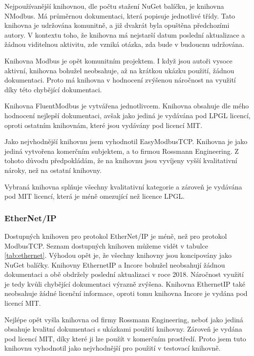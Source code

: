 Nejpoužívanější knihovnou, dle počtu stažení NuGet balíčku, je knihovna NModbus. Má průměrnou dokumentaci, která popisuje jednotlivé třídy. Tato knihovna je udržována komunitně, a již dvakrát byla opuštěna předchozími autory. V kontextu toho, že knihovna má nejstarší datum poslední aktualizace a žádnou viditelnou aktivitu, zde vzniká otázka, zda bude v budoucnu udržována.

Knihovna Modbus je opět komunitním projektem. I když jsou autoři vysoce aktivní, knihovna bohužel neobsahuje, až na krátkou ukázku použití, žádnou dokumentaci. Proto má knihovna v hodnocení zvýšenou náročnost na využití díky této chybějící dokumentaci.  

Knihovna FluentModbus je vytvářena jednotlivcem. Knihovna obsahuje dle mého hodnocení nejlepší dokumentaci, avšak jako jediná je vydávána pod LPGL licencí, oproti ostatním knihovnám, které jsou vydávány pod licencí MIT.

Jako nejvhodnější knihovnu jsem vyhodnotil EasyModbusTCP. Knihovna je jako jediná vytvořena komerčním subjektem, a to firmou Rossmann Engineering. Z tohoto důvodu předpokládám, že na knihovnu jsou vyvíjeny vyšší kvalitativní nároky, než na ostatní knihovny. 

Vybraná knihovna splňuje všechny kvalitativní kategorie a zároveň je vydávána pod MIT licencí, která je méně omezující než licence LPGL.

\subsubsection{EtherNet/IP}

Dostupných knihoven pro protokol EtherNet/IP je méně, než pro protokol ModbusTCP. Seznam dostupných knihoven můžeme vidět v tabulce \ref{tab:ethernet}. Výhodou opět je, že všechny knihovny jsou koncipovány jako NuGet balíčky. Knihovny EthernetIP a Incore bohužel neobsahují žádnou dokumentaci a obě obdržely poslední aktualizaci v roce 2018. Náročnost využití je tedy kvůli chybějící dokumentaci výrazně zvýšena. Knihovna EthernetIP také neobsahuje žádné licenční informace, oproti tomu knihovna Incore je vydána pod licencí MIT.

Nejlépe opět vyšla knihovna od firmy Rossmann Engineering, neboť jako jediná obsahuje kvalitní dokumentaci s ukázkami použití knihovny. Zároveň je vydána pod licencí MIT, díky které ji lze použít v komerčním prostředí. Proto jsem tuto knihovnu vyhodnotil jako nejvhodnější pro použití v testovací knihovně.

